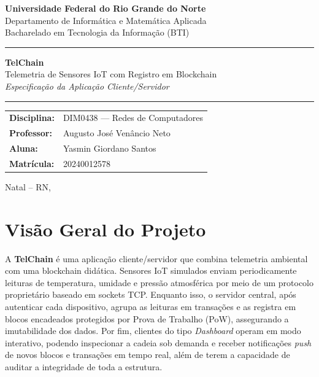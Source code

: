 \documentclass[12pt, a4paper]{article}
\begin{document}
\begin{titlepage}
\centering
\vspace*{0.5cm}

{\large\textbf{Universidade Federal do Rio Grande do Norte}}\\[0.2cm]
{\large Departamento de Informática e Matemática Aplicada}\\[0.2cm]
{\large Bacharelado em Tecnologia da Informação (BTI)}\\[0.8cm]

\noindent\rule{\linewidth}{1.5pt}
\vspace{0.4cm}

{\Huge\bfseries\textcolor{ufrn-blue}{TelChain}}\\[0.3cm]
{\Large Telemetria de Sensores IoT com Registro em Blockchain}\\[0.3cm]
{\large\textit{Especificação da Aplicação Cliente/Servidor}}

\vspace{0.4cm}
\noindent\rule{\linewidth}{1.5pt}

\vspace{1.5cm}

\begin{tabular}{ll}
\textbf{Disciplina:}  & DIM0438 --- Redes de Computadores \\[4pt]
\textbf{Professor:}   & Augusto José Venâncio Neto \\[4pt]
\textbf{Aluna:}       & Yasmin Giordano Santos \\[4pt]
\textbf{Matrícula:}   & 20240012578 \\
\end{tabular}

\vfill

{\small Natal -- RN, \the\year}
\end{titlepage}

\tableofcontents
\newpage

\section{Visão Geral do Projeto}

A \textbf{TelChain} é uma aplicação cliente/servidor que combina telemetria ambiental com uma blockchain didática.
Sensores IoT simulados enviam periodicamente leituras de temperatura, umidade e pressão atmosférica por meio de um
protocolo proprietário baseado em sockets TCP. Enquanto isso, o servidor central, após autenticar cada dispositivo, agrupa as
leituras em transações e as registra em blocos encadeados protegidos por Prova de Trabalho (PoW), assegurando a
imutabilidade dos dados. Por fim, clientes do tipo \emph{Dashboard} operam em modo interativo, podendo inspecionar a cadeia
sob demanda e receber notificações \emph{push} de novos blocos e transações em tempo real, além de terem a capacidade de auditar a
integridade de toda a estrutura.
\end{document}
